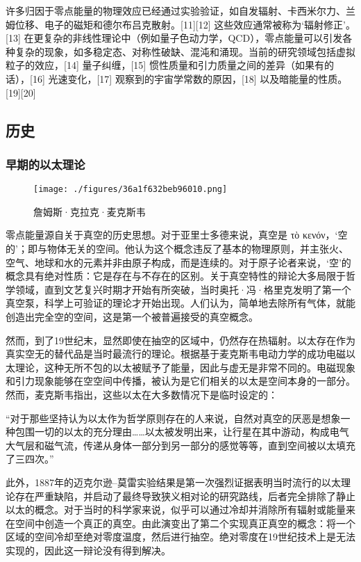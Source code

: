 许多归因于零点能量的物理效应已经通过实验验证，如自发辐射、卡西米尔力、兰姆位移、电子的磁矩和德尔布吕克散射。[11][12] 这些效应通常被称为‘辐射修正’。[13] 在更复杂的非线性理论中（例如量子色动力学，QCD），零点能量可以引发各种复杂的现象，如多稳定态、对称性破缺、混沌和涌现。当前的研究领域包括虚拟粒子的效应，[14] 量子纠缠，[15] 惯性质量和引力质量之间的差异（如果有的话），[16] 光速变化，[17] 观察到的宇宙学常数的原因，[18] 以及暗能量的性质。[19][20]
\subsection{历史 } 
\subsubsection{早期的以太理论}
\begin{figure}[ht]
\centering
\texttt{[image: ./figures/36a1f632beb96010.png]}
\caption{詹姆斯·克拉克·麦克斯韦} \label{fig_LD_4}
\end{figure}
零点能量源自关于真空的历史思想。对于亚里士多德来说，真空是 τὸ κενόν，‘空的’；即与物体无关的空间。他认为这个概念违反了基本的物理原则，并主张火、空气、地球和水的元素并非由原子构成，而是连续的。对于原子论者来说，‘空’的概念具有绝对性质：它是存在与不存在的区别。关于真空特性的辩论大多局限于哲学领域，直到文艺复兴时期才开始有所突破，当时奥托·冯·格里克发明了第一个真空泵，科学上可验证的理论才开始出现。人们认为，简单地去除所有气体，就能创造出完全空的空间，这是第一个被普遍接受的真空概念。

然而，到了19世纪末，显然即使在抽空的区域中，仍然存在热辐射。以太存在作为真实空无的替代品是当时最流行的理论。根据基于麦克斯韦电动力学的成功电磁以太理论，这种无所不包的以太被赋予了能量，因此与虚无是非常不同的。电磁现象和引力现象能够在空空间中传播，被认为是它们相关的以太是空间本身的一部分。然而，麦克斯韦指出，这些以太在大多数情况下是临时设定的：

“对于那些坚持认为以太作为哲学原则存在的人来说，自然对真空的厌恶是想象一种包围一切的以太的充分理由……以太被发明出来，让行星在其中游动，构成电气大气层和磁气流，传递从身体一部分到另一部分的感觉等等，直到空间被以太填充了三四次。”

此外，1887年的迈克尔逊–莫雷实验结果是第一次强烈证据表明当时流行的以太理论存在严重缺陷，并启动了最终导致狭义相对论的研究路线，后者完全排除了静止以太的概念。对于当时的科学家来说，似乎可以通过冷却并消除所有辐射或能量来在空间中创造一个真正的真空。由此演变出了第二个实现真正真空的概念：将一个区域的空间冷却至绝对零度温度，然后进行抽空。绝对零度在19世纪技术上是无法实现的，因此这一辩论没有得到解决。
